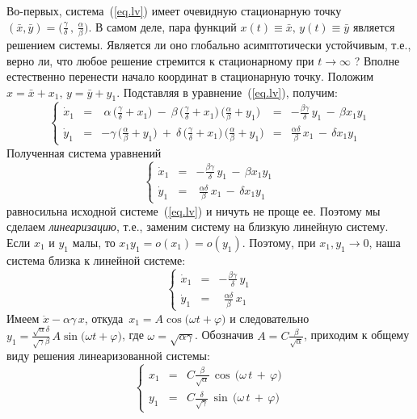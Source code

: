 \documentclass[12pt,a4paper]{article}
\begin{document}
Во-первых, система~(\ref{eq.lv}) имеет очевидную стационарную точку $(\bar x, \bar y) = \bigl(\frac{\gamma}{\delta}\, , \, \frac{\alpha}{\beta} \bigr)$. В самом деле, пара функций $x(t)\equiv \bar x, \, y(t) \equiv \bar y$ является решением системы. Является ли оно глобально асимптотически устойчивым, т.е., верно ли, что любое решение стремится к стационарному при $t \to \infty$ ?
Вполне естественно перенести начало координат в стационарную точку. Положим $x = \bar x + x_1, \, y = \bar y + y_1$.
Подставляя в уравнение~(\ref{eq.lv}), получим:
$$
\left\{
\begin{array}{cclcl}
\dot x_1 & = & \ \alpha \, \bigl(\frac{\gamma}{\delta} + x_1\bigr) \ - \ \beta \,
\bigl(\frac{\gamma}{\delta} + x_1\bigr)\, \bigl(\frac{\alpha}{\beta} + y_1\bigr) & = &
- \frac{\beta \gamma}{\delta}\, y_1  \, - \, \beta x_1 y_1\\
\dot y_1 & = & - \gamma \, \bigl(\frac{\alpha}{\beta} + y_1\bigr) \ + \ \delta \,
\bigl(\frac{\gamma}{\delta} + x_1\bigr)\, \bigl(\frac{\alpha}{\beta} + y_1\bigr) & = &
 \frac{\alpha \delta}{\beta}\, x_1  \, - \, \delta x_1 y_1
\end{array}
\right.
$$
Полученная система уравнений
$$
\left\{
\begin{array}{ccl}
\dot x_1 & = &  - \frac{\beta \gamma}{\delta}\, y_1  \, - \, \beta x_1 y_1\\
\dot y_1 & = & \ \frac{\alpha \delta}{\beta}\, x_1  \, - \, \delta x_1 y_1
\end{array}
\right.
$$
 равносильна исходной системе~(\ref{eq.lv}) и ничуть не проще ее.
Поэтому мы сделаем {\em линеаризацию}, т.е., заменим систему на близкую линейную систему.
Если $x_1$ и $y_1$ малы, то $x_1y_1 = o(x_1) = o(y_1)$. Поэтому, при $x_1 , y_1 \to 0$, наша система близка к линейной
системе:
\begin{equation}\label{eq.lv-lin}
\left\{
\begin{array}{ccl}
\dot x_1 & = & - \frac{\beta \gamma }{\delta}\, y_1\\
\dot y_1 & = &  \ \ \frac{\alpha \delta }{\beta}\, x_1
\end{array}
\right.
\end{equation}
Имеем $\ddot x - \alpha \gamma \, x$, откуда $\, x_1 = A \cos \bigl(\omega t + \varphi \bigr)$ и
следовательно $y_1 = \frac{\sqrt{\alpha}\delta}{\sqrt{\gamma} \beta}\, A \sin \bigl(\omega t + \varphi \bigr)$,
где $\omega = \sqrt{\alpha \gamma}$. Обозначив $A = C\frac{\beta}{\sqrt{\alpha}}$, приходим к общему виду решения линеаризованной системы:
\begin{equation}\label{eq.lv-lin-sol}
\left\{
\begin{array}{ccl}
x_1 & = & C\frac{\beta}{\sqrt{\alpha}}\, \cos \, \bigl(\omega \, t \, + \, \varphi \bigr)\\
y_1 & = &  C\frac{\delta}{\sqrt{\gamma}}\, \sin \, \bigl(\omega \, t \, + \, \varphi \bigr)
\end{array}
\right.
\end{equation}
\end{document}
